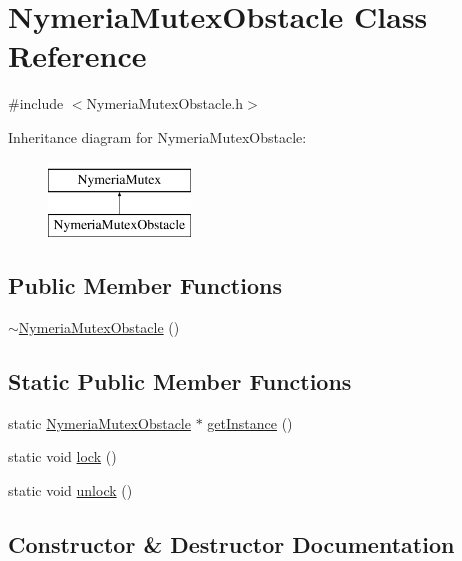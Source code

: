 \hypertarget{class_nymeria_mutex_obstacle}{}\section{Nymeria\+Mutex\+Obstacle Class Reference}
\label{class_nymeria_mutex_obstacle}


{\ttfamily \#include $<$Nymeria\+Mutex\+Obstacle.\+h$>$}

Inheritance diagram for Nymeria\+Mutex\+Obstacle\+:\begin{figure}[H]
\begin{center}
\leavevmode
\includegraphics[height=2.000000cm]{class_nymeria_mutex_obstacle}
\end{center}
\end{figure}
\subsection*{Public Member Functions}
\begin{DoxyCompactItemize}
\item 
\hyperlink{class_nymeria_mutex_obstacle_a633b42cd43d18923e7dbe0430fc0bf8c}{$\sim$\+Nymeria\+Mutex\+Obstacle} ()
\end{DoxyCompactItemize}
\subsection*{Static Public Member Functions}
\begin{DoxyCompactItemize}
\item 
static \hyperlink{class_nymeria_mutex_obstacle}{Nymeria\+Mutex\+Obstacle} $\ast$ \hyperlink{class_nymeria_mutex_obstacle_a781305cfbe891eaf547c9d023b42d272}{get\+Instance} ()
\item 
static void \hyperlink{class_nymeria_mutex_obstacle_ac9c77e3c39a6037aaf356d9d82460a40}{lock} ()
\item 
static void \hyperlink{class_nymeria_mutex_obstacle_ae10b2974844ac973a692be10eeaddf79}{unlock} ()
\end{DoxyCompactItemize}


\subsection{Constructor \& Destructor Documentation}
\hypertarget{class_nymeria_mutex_obstacle_a633b42cd43d18923e7dbe0430fc0bf8c}{}
